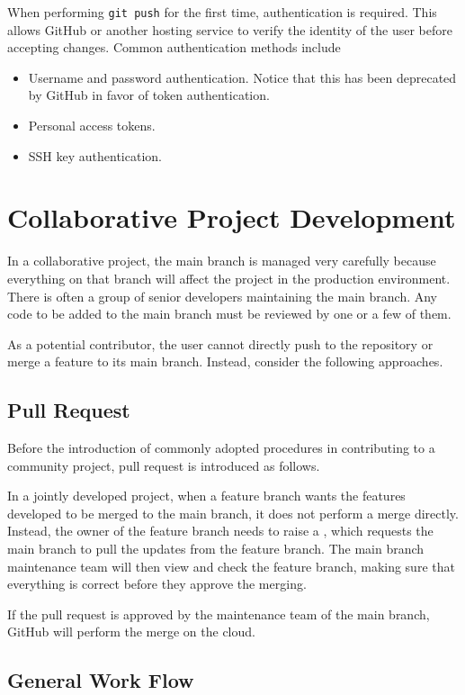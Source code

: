 When performing \texttt{git push} for the first time, authentication is required. This allows GitHub or another hosting service to verify the identity of the user before accepting changes. Common authentication methods include
\begin{itemize}
    \item Username and password authentication. Notice that this has been deprecated by GitHub in favor of token authentication.
    \item Personal access tokens.
    \item SSH key authentication.
\end{itemize}

\section{Collaborative Project Development}

In a collaborative project, the main branch is managed very carefully because everything on that branch will affect the project in the production environment. There is often a group of senior developers maintaining the main branch. Any code to be added to the main branch must be reviewed by one or a few of them.

As a potential contributor, the user cannot directly push to the repository or merge a feature to its main branch. Instead, consider the following approaches.

\subsection{Pull Request} \label{sec:pull_request}

Before the introduction of commonly adopted procedures in contributing to a community project, pull request is introduced as follows.

In a jointly developed project, when a feature branch wants the features developed to be merged to the main branch, it does not perform a merge directly. Instead, the owner of the feature branch needs to raise a , which requests the main branch to pull the updates from the feature branch. The main branch maintenance team will then view and check the feature branch, making sure that everything is correct before they approve the merging.

If the pull request is approved by the maintenance team of the main branch, GitHub will perform the merge on the cloud.

\subsection{General Work Flow}

